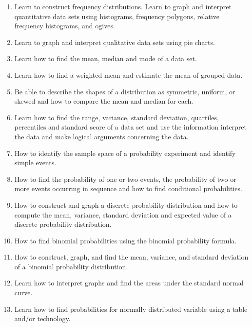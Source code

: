 \documentclass[11pt]{article}
\newenvironment{alphalist}{
\begin{enumerate}[label=(\arabic*),widest=107 ,leftmargin=25pt, itemsep=0pt]}
{\end{enumerate}}
\begin{document}
 \begin{alphalist}
 \item Learn to construct frequency distributions. Learn to graph 
 and interpret quantitative data  sets using histograms, frequency 
 polygons, relative frequency histograms, and ogives.

\item Learn to graph and interpret qualitative data sets using 
pie charts.

\item Learn how to find the mean, median and mode of a data set.

\item Learn how to find a weighted mean and estimate the mean of 
grouped data. 

\item Be able to describe the shapes of a distribution as symmetric, 
uniform, or skewed and  how to compare the mean and median for each. 

\item Learn how to find the range, variance, standard deviation, 
quartiles, percentiles and  standard score of a data set and use 
the information interpret the data and make logical arguments 
concerning the data.

\item How to identify the sample space of a probability experiment 
and identify simple  events.

\item How to find the probability of one or two events, the 
probability of two or more events occurring in sequence and how to 
find conditional probabilities. 

\item How to construct and graph a discrete probability distribution 
and how to compute the   mean, variance, standard deviation and 
expected value of a discrete probability  distribution.

\item How to find binomial probabilities using the binomial 
probability formula.

\item How to construct, graph, and find the mean, variance, and 
standard deviation of a  binomial probability distribution.

\item Learn how to interpret graphs and find the areas under the 
standard normal curve.

\item Learn how to find probabilities for normally distributed 
variable using a table and/or  technology.


\end{alphalist}
\end{document}
